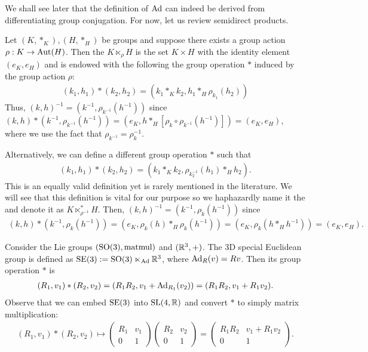 \documentclass[12pt,class=article,crop=false]{standalone}
\begin{document}
We shall see later that the definition of $ \operatorname{Ad}$ can indeed be derived from differentiating group conjugation. For now, let us review semidirect products.
\begin{defn}
	Let $ (K,*_K), (H,*_H)$ be groups and suppose there exists a group action $ \rho: K \to \operatorname{Aut} (H)$.  Then the  $K \ltimes_\rho H$ is the set $ K \times H$ with the identity element $ (e_K,e_H)$ and is endowed with the following the group operation $ *$ induced by the group action $ \rho$:
\begin{align*}
(k_1,h_1)*(k_2,h_2) = (k_1 *_K k_2, h_1 *_H \rho_{k_1}(h_2))
\end{align*}
Thus, $ (k,h)^{-1} = (k^{-1}, \rho_{k^{-1}}(h^{-1}))$ since $ (k,h)*(k^{-1},\rho_{k^{-1}}(h^{-1})) = (e_K, h *_H [\rho_k \circ \rho_{k^{-1}}(h^{-1})]) = (e_K, e_H)$, where we use the fact that $ \rho_{k^{-1}} = \rho_k^{-1}$.

Alternatively, we can define a different group operation $ *$ such that
\begin{align*}
	(k_1,h_1)*(k_2,h_2) = (k_1 *_K k_2, \rho_{k_2 ^{-1}}(h_1) *_H h_2).
\end{align*}
This is an equally valid definition yet is rarely mentioned in the literature. We will see that this definition is vital for our purpose so we haphazardly name it the  and denote it as $ K \ltimes_{\rho^{-1}}^* H$. Then, $ (k,h)^{-1} = (k^{-1}, \rho_{k}(h^{-1}))$ since
\begin{align*}
	(k,h)*(k^{-1}, \rho_{k} (h^{-1})) = (e_K, \rho_k(h) *_H \rho_k(h^{-1})) = (e_K, \rho_k (h *_H h^{-1})) = (e_K, e_H).
\end{align*}
\end{defn}
\begin{eg}
Consider the Lie groups $ (\operatorname{SO}(3), \text{matmul}) $ and $ (\mathbb{R}^3,+)$. The 3D special Euclidean group is defined as $ \operatorname{SE}(3) := \operatorname{SO}(3) \ltimes _{\operatorname{Ad}} \mathbb{R}^3$, where $ \operatorname{Ad}_{ R}( v) = Rv$. Then its group operation $ *$ is
\begin{align*}
	(R_1,v_1)*(R_2,v_2) = (R_1R_2, v_1 + \operatorname{Ad}_{ R_1}( v_2)) = (R_1R_2, v_1+ R_1 v_2). 
\end{align*}
Observe that we can embed $ \operatorname{SE}(3)$ into  $ \operatorname{SL}(4, \mathbb{R})$ and convert $ *$ to simply matrix multiplication:
 \begin{align*}
	 (R_1,v_1)*(R_2,v_2) \mapsto  \begin{pmatrix} R_1& v_1\\ 0 & 1 \end{pmatrix} \begin{pmatrix} R_2 & v_2\\ 0& 1 \end{pmatrix} = \begin{pmatrix} R_1R_2& v_1 + R_1v_2\\0&1 \end{pmatrix}  .
\end{align*}
\end{eg}
\end{document}
